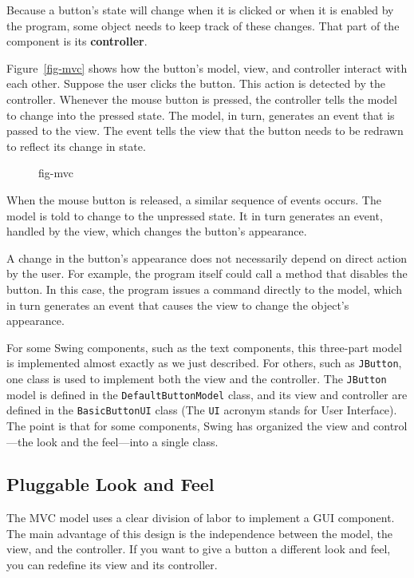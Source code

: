 Because a button's state will change when it is clicked or when it is
enabled by the program, some object needs to keep track of these
changes.  That part of the component is its {\bf
controller}.  

Figure~\ref{fig-mvc} shows how the button's model, view, and
controller interact with each other.  Suppose the user clicks the
button.  This action is detected by the controller.  Whenever the mouse
button is pressed, the controller tells the model to change into the
pressed state.  The model, in turn, generates an event that is passed
to the view.  The event tells the view that the button needs to be
redrawn to reflect its change in state.

\begin{figure}[t]
{fig-mvc}

\end{figure}

When the mouse button is released, a similar sequence of events occurs.
The model is told to change to the unpressed state.  It in turn
generates an event, handled by the view, which changes the button's
appearance.

A change in the button's appearance does not necessarily depend on
direct action by the user.  For example, the program itself could call a
method that disables the button.  In this case, the program issues a
\mbox{command} \mbox{directly} to the model, which in turn generates an event that
causes the view to change the object's appearance.

For some Swing components, such as the text components, this
three-part model is implemented almost exactly as we just
described.  For others, such as {\tt JButton}, one class is used to
implement both the view and the controller.  The {\tt JButton} model is
defined in the {\tt DefaultButtonModel} class, and its view and
controller are defined in the {\tt BasicButtonUI} class (The {\tt UI}
acronym stands for User Interface).  The point is that for some
components, Swing has organized the view and control---the look and
the feel---into a single class.

\subsection{Pluggable Look and Feel}
\noindent The MVC model uses a clear division of labor to implement a GUI
component.   The main advantage of this design is the independence
between the model, the view, and the controller.  If you want to give a
button a different look and feel, you can redefine its view and its
controller.

